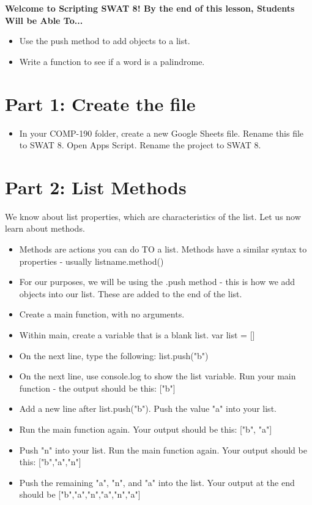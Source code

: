 \documentclass{article}
\newcommand{\AName}{Scripting SWAT 8}
\begin{document}
\textbf{Welcome to \AName!  By the end of this lesson, Students Will be Able To...}
\begin{itemize}
    \item Use the push method to add objects to a list.
    \item Write a function to see if a word is a palindrome.
\end{itemize}


\section*{Part 1: Create the file}
\begin{itemize}
    \item In your COMP-190 folder, create a new Google Sheets file. Rename this file to SWAT 8.  Open Apps Script.  Rename the project to SWAT 8.
\end{itemize}

\section*{Part 2: List Methods}
We know about list properties, which are characteristics of the list.  Let us now learn about methods.
\begin{itemize}
    \item Methods are actions you can do TO a list.  Methods have a similar syntax to properties - usually listname.method()
    \item For our purposes, we will be using the .push method - this is how we add objects into our list.  These are added to the end of the list.
    \item Create a main function, with no arguments.
    \item Within main, create a variable that is a blank list.  var list = []
    \item On the next line, type the following:  list.push("b")
    \item On the next line, use console.log to show the list variable.  Run your main function - the output should be this:  ["b"]
    \item Add a new line after list.push("b").  Push the value "a" into your list.
    \item Run the main function again.  Your output should be this:  ["b", "a"]
    \item Push "n" into your list.  Run the main function again.  Your output should be this:  ["b","a","n"]
    \item Push the remaining "a", "n", and "a" into the list.  Your output at the end should be ["b","a","n","a","n","a"]
\end{itemize}
\end{document}
